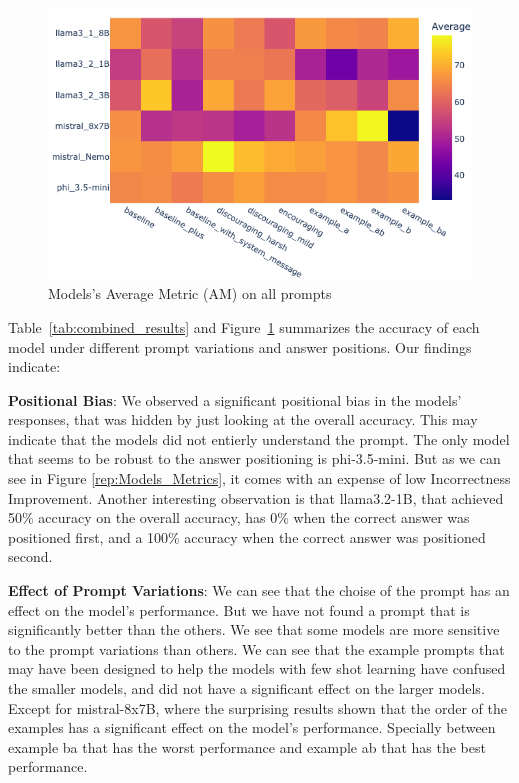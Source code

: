 \begin{figure}[ht!]
  \includegraphics[width=\columnwidth]{img/model_performence_on_prompts.png}
  \caption{Models's Average Metric (AM) on all prompts}
  \label{rep: Models average heatmap}
\end{figure}

Table~\ref{tab:combined_results} and Figure~\ref{rep: Models average heatmap} summarizes the accuracy of each model under different prompt variations and answer positions. Our findings indicate:

\textbf{Positional Bias}: We observed a significant positional bias in the models' responses, that was hidden by just looking at the overall accuracy. This may indicate that the models did not entierly understand the prompt. The only model that seems to be robust to the answer positioning is phi-3.5-mini. But as we can see in Figure \ref{rep:Models_Metrics}, it comes with an expense of low Incorrectness Improvement. Another interesting observation is that llama3.2-1B, that achieved 50\% accuracy on the overall accuracy, has 0\% when the correct answer was positioned first, and a 100\% accuracy when the correct answer was positioned second.

\textbf{Effect of Prompt Variations}: We can see that the choise of the prompt has an effect on the model's performance. But we have not found a prompt that is significantly better than the others. We see that some models are more sensitive to the prompt variations than others. We can see that the example prompts that may have been designed to help the models with few shot learning have confused the smaller models, and did not have a significant effect on the larger models. Except for mistral-8x7B, where the surprising results shown that the order of the examples has a significant effect on the model's performance. Specially between example ba that has the worst performance and example ab that has the best performance.

